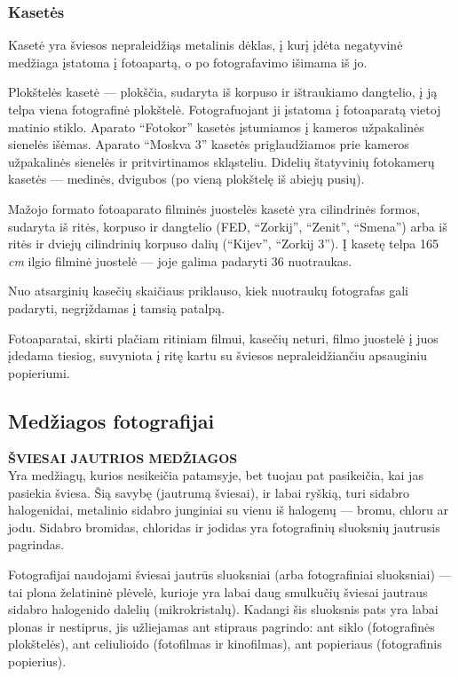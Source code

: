 \documentclass[12pt]{book}
\begin{document}
				\subsubsection*{Kasetės}
					Kasetė yra šviesos nepraleidžiąs metalinis dėklas, į kurį įdėta negatyvinė medžiaga įstatoma į fotoapartą, o po fotografavimo išimama iš jo.

					Plokštelės kasetė --- plokščia, sudaryta iš korpuso ir ištraukiamo dangtelio, į ją telpa viena fotografinė plokštelė. Fotografuojant ji įstatoma į fotoaparatą vietoj matinio stiklo. Aparato ``Fotokor'' kasetės įstumiamos į kameros užpakalinės sienelės išėmas. Aparato ``Moskva 3'' kasetės priglaudžiamos prie kameros užpakalinės sienelės ir pritvirtinamos skląsteliu. Didelių štatyvinių fotokamerų kasetės --- medinės, dvigubos (po vieną plokštelę iš abiejų pusių).

					Mažojo formato fotoaparato filminės juostelės kasetė yra cilindrinės formos, sudaryta iš ritės, korpuso ir dangtelio (FED, ``Zorkij'', ``Zenit'', ``Smena'') arba iš ritės ir dviejų cilindrinių korpuso dalių (``Kijev'', ``Zorkij 3''). Į kasetę telpa 165 \textit{cm} ilgio filminė juostelė --- joje galima padaryti 36 nuotraukas.

					Nuo atsarginių kasečių skaičiaus priklauso, kiek nuotraukų fotografas gali padaryti, negrįždamas į tamsią patalpą.

					Fotoaparatai, skirti plačiam ritiniam filmui, kasečių neturi, filmo juostelė į juos įdedama tiesiog, suvyniota į ritę kartu su šviesos nepraleidžiančiu apsauginiu popieriumi.
			\subsection*{Medžiagos fotografijai}
				\textbf{ŠVIESAI JAUTRIOS MEDŽIAGOS}\\
				Yra medžiagų, kurios nesikeičia patamsyje, bet tuojau pat pasikeičia, kai jas pasiekia šviesa. Šią savybę (jautrumą šviesai), ir labai ryškią, turi sidabro halogenidai, metalinio sidabro junginiai su vienu iš halogenų --- bromu, chloru ar jodu. Sidabro bromidas, chloridas ir jodidas yra fotografinių sluoksnių jautrusis pagrindas.

				Fotografijai naudojami šviesai jautrūs sluoksniai (arba fotografiniai sluoksniai) --- tai plona želatininė plėvelė, kurioje yra labai daug smulkučių šviesai jautraus sidabro halogenido dalelių (mikrokristalų). Kadangi šis sluoksnis pats yra labai plonas ir nestiprus, jis užliejamas ant stipraus pagrindo: ant siklo (fotografinės plokštelės), ant celiulioido (fotofilmas ir kinofilmas), ant popieriaus (fotografinis popierius).
\end{document}
